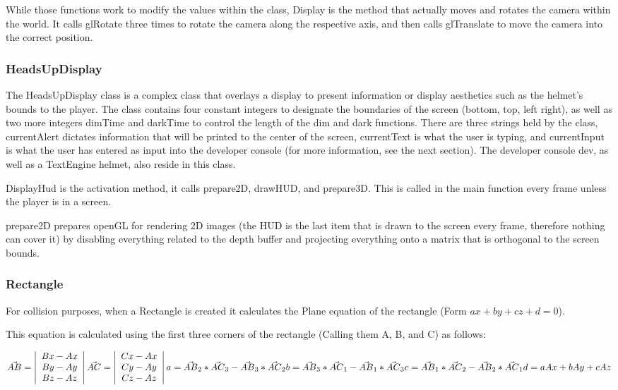 \documentclass{article}
\begin{document}
While those functions work to modify the values within the class, Display is the method that actually moves and rotates the camera within the world. It calls glRotate three times to rotate the camera along the respective axis, and then calls glTranslate to move the camera into the correct position.

\subsubsection{HeadsUpDisplay}

The HeadsUpDisplay class is a complex class that overlays a display to present information or display aesthetics such as the helmet's bounds to the player. The class contains four constant integers to designate the boundaries of the screen (bottom, top, left right), as well as two more integers dimTime and darkTime to control the length of the dim and dark functions. There are three strings held by the class, currentAlert dictates information that will be printed to the center of the screen, currentText is what the user is typing, and currentInput is what the user has entered as input into the developer console (for more information, see the next section). The developer console dev, as well as a TextEngine helmet, also reside in this class.

DisplayHud is the activation method, it calls prepare2D, drawHUD, and prepare3D. This is called in the main function every frame unless the player is in a screen. 

prepare2D prepares openGL for rendering 2D images (the HUD is the last item that is drawn to the screen every frame, therefore nothing can cover it) by disabling everything related to the depth buffer and projecting everything onto a matrix that is orthogonal to the screen bounds.

\subsubsection{Rectangle} For collision purposes, when a Rectangle is created it calculates the Plane equation of the rectangle (Form $ax + by + cz + d = 0$).

This equation is calculated using the first three corners of the rectangle (Calling them A, B, and C) as follows:

\noindent
$
\vec{AB} = \left| \begin{array}{c}
	Bx - Ax \\
	By - Ay \\
	Bz - Az
 \end{array} \right|
\vec{AC} = \left| \begin{array}{c}
	Cx - Ax \\
	Cy - Ay \\
	Cz - Az
 \end{array} \right| \\
a = \vec{AB}_2 * \vec{AC}_3 - \vec{AB}_3 * \vec{AC}_2 \\
b = \vec{AB}_3 * \vec{AC}_1 - \vec{AB}_1 * \vec{AC}_3 \\
c = \vec{AB}_1 * \vec{AC}_2 - \vec{AB}_2 * \vec{AC}_1 \\
d = aAx + bAy + cAz
$
\end{document}
